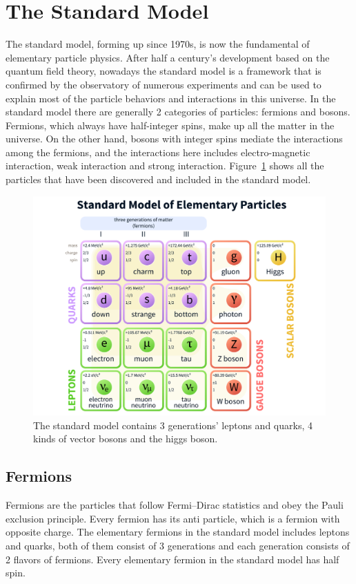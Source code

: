 
\section{The Standard Model}
The standard model\cite{SMref1}\cite{SMref2}\cite{SMref3}, forming up since 1970s, is now the fundamental of elementary particle physics. After half a century's development based on the quantum field theory, nowadays the standard model is a framework that is confirmed by the observatory of numerous experiments and can be used to explain most of the particle behaviors and interactions in this universe. In the standard model there are generally 2 categories of particles: fermions and bosons. Fermions, which always have half-integer spins, make up all the matter in the universe. On the other hand, bosons with integer spins mediate the interactions among the fermions, and the interactions here includes electro-magnetic interaction, weak interaction and strong interaction. Figure~\ref{fig:smpfamily} shows all the particles that have been discovered and included in the standard model.
\begin{figure}[htbp]
\begin{center}
\includegraphics[width=0.72\linewidth]{figures/smpfamily.pdf}
\caption{The standard model contains 3 generations' leptons and quarks, 4 kinds of vector bosons and the higgs boson.}
\label{fig:smpfamily}
\end{center}
\end{figure}

\subsection{Fermions}
Fermions are the particles that follow Fermi–Dirac statistics and obey the Pauli exclusion principle. Every fermion has its anti particle, which is a fermion with opposite charge. The elementary fermions in the standard model includes leptons and quarks, both of them consist of 3 generations and each generation consists of 2 flavors of fermions. Every elementary fermion in the standard model has half spin. 
